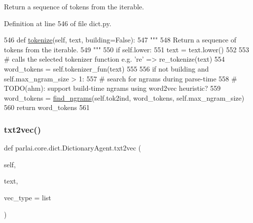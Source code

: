 \begin{DoxyVerb}Return a sequence of tokens from the iterable.
\end{DoxyVerb}
 

Definition at line 546 of file dict.\+py.


\begin{DoxyCode}
546     \textcolor{keyword}{def }\hyperlink{namespaceparlai_1_1agents_1_1tfidf__retriever_1_1build__tfidf_a1fdb457e98eb4e4c26047e229686a616}{tokenize}(self, text, building=False):
547         \textcolor{stringliteral}{"""}
548 \textcolor{stringliteral}{        Return a sequence of tokens from the iterable.}
549 \textcolor{stringliteral}{        """}
550         \textcolor{keywordflow}{if} self.lower:
551             text = text.lower()
552 
553         \textcolor{comment}{# calls the selected tokenizer function e.g. 're' => re\_tokenize(text)}
554         word\_tokens = self.tokenizer\_fun(text)
555 
556         \textcolor{keywordflow}{if} \textcolor{keywordflow}{not} building \textcolor{keywordflow}{and} self.max\_ngram\_size > 1:
557             \textcolor{comment}{# search for ngrams during parse-time}
558             \textcolor{comment}{# TODO(ahm): support build-time ngrams using word2vec heuristic?}
559             word\_tokens = \hyperlink{namespaceparlai_1_1core_1_1dict_a5e9eb43b6c0dce0b3aab7f3ea3717de6}{find\_ngrams}(self.tok2ind, word\_tokens, self.max\_ngram\_size)
560         \textcolor{keywordflow}{return} word\_tokens
561 
\end{DoxyCode}
\mbox{\label{classparlai_1_1core_1_1dict_1_1DictionaryAgent_abc3baf742422fc7cdaece698224709d4}} 
\subsubsection{\texorpdfstring{txt2vec()}{txt2vec()}}
{\footnotesize\ttfamily def parlai.\+core.\+dict.\+Dictionary\+Agent.\+txt2vec (\begin{DoxyParamCaption}\item[{}]{self,  }\item[{}]{text,  }\item[{}]{vec\+\_\+type = {\ttfamily list} }\end{DoxyParamCaption})}

